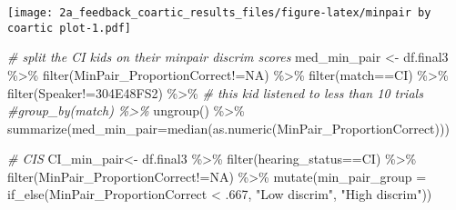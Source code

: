 \documentclass[
]{article}
\newenvironment{Shaded}{\begin{snugshade}}{\end{snugshade}}
\newcommand{\AttributeTok}[1]{\textcolor[rgb]{0.77,0.63,0.00}{#1}}
\newcommand{\CommentTok}[1]{\textcolor[rgb]{0.56,0.35,0.01}{\textit{#1}}}
\newcommand{\DecValTok}[1]{\textcolor[rgb]{0.00,0.00,0.81}{#1}}
\newcommand{\FunctionTok}[1]{\textcolor[rgb]{0.00,0.00,0.00}{#1}}
\newcommand{\NormalTok}[1]{#1}
\newcommand{\OtherTok}[1]{\textcolor[rgb]{0.56,0.35,0.01}{#1}}
\newcommand{\SpecialCharTok}[1]{\textcolor[rgb]{0.00,0.00,0.00}{#1}}
\newcommand{\StringTok}[1]{\textcolor[rgb]{0.31,0.60,0.02}{#1}}
\begin{document}
\texttt{[image: 2a\_feedback\_coartic\_results\_files/figure-latex/minpair by coartic plot-1.pdf]}

\begin{Shaded}
\begin{Highlighting}[]
\CommentTok{\# split the CI kids on their minpair discrim scores}
\NormalTok{med\_min\_pair }\OtherTok{\textless{}{-}}\NormalTok{ df.final3 }\SpecialCharTok{\%\textgreater{}\%}
  \FunctionTok{filter}\NormalTok{(MinPair\_ProportionCorrect}\SpecialCharTok{!=}\StringTok{\textquotesingle{}NA\textquotesingle{}}\NormalTok{) }\SpecialCharTok{\%\textgreater{}\%}
  \FunctionTok{filter}\NormalTok{(match}\SpecialCharTok{==}\StringTok{\textquotesingle{}CI\textquotesingle{}}\NormalTok{) }\SpecialCharTok{\%\textgreater{}\%}
  \FunctionTok{filter}\NormalTok{(Speaker}\SpecialCharTok{!=}\StringTok{\textquotesingle{}304E48FS2\textquotesingle{}}\NormalTok{) }\SpecialCharTok{\%\textgreater{}\%} \CommentTok{\# this kid listened to less than 10 trials}
  \CommentTok{\#group\_by(match) \%\textgreater{}\%}
  \FunctionTok{ungroup}\NormalTok{() }\SpecialCharTok{\%\textgreater{}\%}
  \FunctionTok{summarize}\NormalTok{(}\AttributeTok{med\_min\_pair=}\FunctionTok{median}\NormalTok{(}\FunctionTok{as.numeric}\NormalTok{(MinPair\_ProportionCorrect)))}

\CommentTok{\# CIS}
\NormalTok{CI\_min\_pair}\OtherTok{\textless{}{-}}\NormalTok{ df.final3 }\SpecialCharTok{\%\textgreater{}\%}
  \FunctionTok{filter}\NormalTok{(hearing\_status}\SpecialCharTok{==}\StringTok{\textquotesingle{}CI\textquotesingle{}}\NormalTok{) }\SpecialCharTok{\%\textgreater{}\%}
  \FunctionTok{filter}\NormalTok{(MinPair\_ProportionCorrect}\SpecialCharTok{!=}\StringTok{\textquotesingle{}NA\textquotesingle{}}\NormalTok{) }\SpecialCharTok{\%\textgreater{}\%}
  \FunctionTok{mutate}\NormalTok{(}\AttributeTok{min\_pair\_group =} \FunctionTok{if\_else}\NormalTok{(MinPair\_ProportionCorrect }\SpecialCharTok{\textless{}}\NormalTok{ .}\DecValTok{667}\NormalTok{, }
                            \StringTok{"Low discrim"}\NormalTok{, }
                            \StringTok{"High discrim"}\NormalTok{))}


\end{Highlighting}
\end{Shaded}
\end{document}
